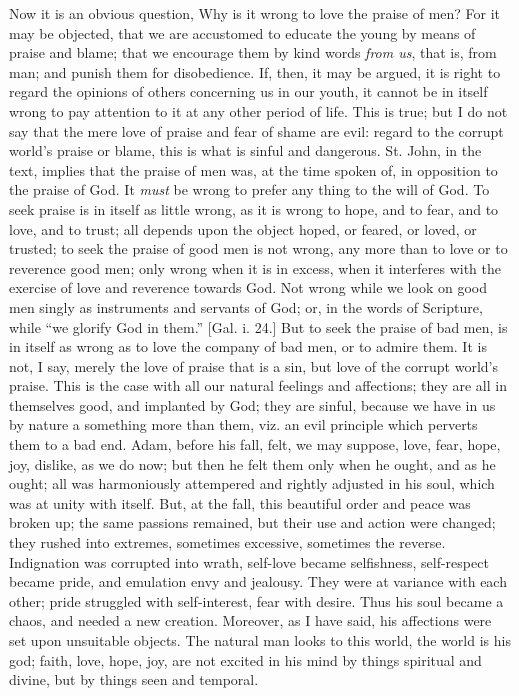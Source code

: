 Now it is an obvious question, Why is it wrong to love the praise
of men? For it may be objected, that we are accustomed to educate the
young by means of praise and blame; that we encourage them by kind
words \emph{from us}, that is, from man; and punish them for
disobedience. If, then, it may be argued, it is right to regard the
opinions of others concerning us in our youth, it cannot be in itself
wrong to pay attention to it at any other period of life. This is
true; but I do not say that the mere love of praise and fear of shame
are evil: regard to the corrupt world's praise or blame, this is what
is sinful and dangerous. St. John, in the text, implies that the
praise of men was, at the time spoken of, in opposition to the praise
of God. It \emph{must} be wrong to prefer any thing to the will of
God. To seek praise is in itself as little wrong, as it is wrong to
hope, and to fear, and to love, and to trust; all depends upon the
object hoped, or feared, or loved, or trusted; to seek the praise of
good men is not wrong, any more than to love or to reverence good men;
only wrong when it is in excess, when it interferes with the exercise
of love and reverence towards God. Not wrong while we look on good men
singly as instruments and servants of God; or, in the words of
Scripture, while ``we glorify God in them.'' [Gal. i. 24.] But
to seek the praise of bad men, is in itself as wrong as to love the
company of bad men, or to admire them. It is not, I say, merely the
love of praise that is a sin, but love of the corrupt world's praise.
This is the case with all our natural feelings and affections; they
are all in themselves good, and implanted by God; they are sinful,
because we have in us by nature a something more than them, viz. an
evil principle which perverts them to a bad end. Adam, before his
fall, felt, we may suppose, love, fear, hope, joy, dislike, as we do
now; but then he felt them only when he ought, and as he ought; all
was harmoniously attempered and rightly adjusted in his soul, which
was at unity with itself. But, at the fall, this beautiful order and
peace was broken up; the same passions remained, but their use and
action were changed; they rushed into extremes, sometimes excessive,
sometimes the reverse. Indignation was corrupted into wrath, self-love
became selfishness, self-respect became pride, and emulation envy and
jealousy. They were at variance with each other; pride struggled with
self-interest, fear with desire. Thus his soul became a chaos, and
needed a new creation. Moreover, as I have said, his affections were
set upon unsuitable objects. The natural man looks to this world, the
world is his god; faith, love, hope, joy, are not excited in his mind
by things spiritual and divine, but by things seen and temporal.

